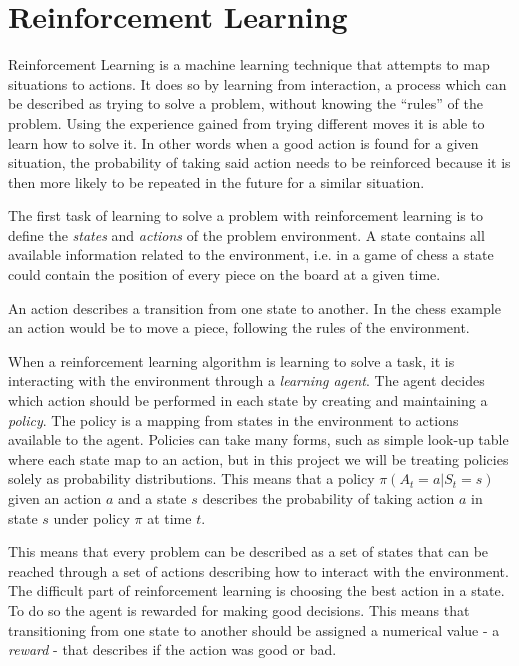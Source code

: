 \documentclass[11pt]{article}
\begin{document}
\maketitle

\section{Reinforcement Learning}

Reinforcement Learning is a machine learning technique that attempts 
to map situations to actions.
It does so by learning from interaction, a process which can be described as trying to solve a problem,
without knowing the “rules” of the problem.
Using the experience gained from trying different moves it is able to learn how to solve it.
In other words when a good action is found for a given situation,
the probability of taking said action needs to be reinforced because it is then more likely to be
repeated in the future for a similar situation.

The first task of learning to solve a problem with reinforcement learning is to define
the \textit{states} and \textit{actions} of the problem environment.
A state contains all available information related to the environment,
i.e. in a game of chess a state could contain the position of every piece on the board at
a given time.

An action describes a transition from one state to another.
In the chess example an action would be to move a piece, following the rules of the
environment.

When a reinforcement learning algorithm is learning to solve a task, it is
interacting with the environment through a \textit{learning agent}.
The agent decides which action should be performed in each state by creating and maintaining a \textit{policy}.
The policy is a mapping from states in the environment to actions available to the agent\cite{RLBook}.
Policies can take many forms, such as simple look-up table where each state map to an
action, but in this project we will be treating policies solely as probability distributions.
This means that a policy $\pi(A_t = a|S_t = s)$ given an action $a$ and a state $s$ describes the
probability of taking action $a$ in state $s$ under policy $\pi$ at time $t$.

This means that every problem can be described as a set of states that can be reached
through a set of actions describing how to interact with the environment.
The difficult part of reinforcement learning is choosing the best action in a
state.
To do so the agent is rewarded for making good decisions.
This means that transitioning from one state to another should be assigned a numerical value
- a \textit{reward} - that describes if the action was good or bad.
\end{document}
